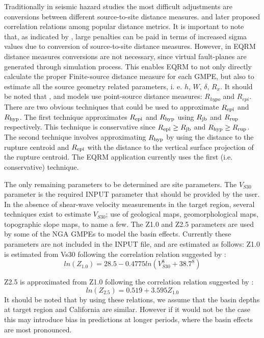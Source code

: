 Traditionally in seismic hazard studies the most difficult
adjustments are conversions between different source-to-site
distance measures. \citet{eqrm_Scherbaum04b} and later
\citet{eqrm_Kak11} proposed correlation relations among popular
distance metrics. It is important to note that, as indicated by
\citet{eqrm_Scherbaum05}, large penalties can be paid in terms of
increased sigma values due to conversion of source-to-site distance
measures. However, in EQRM distance measures conversions are not
necessary, since virtual fault-planes are generated through
simulation process. This enables EQRM to not only directly calculate
the proper Finite-source distance measure for each GMPE, but also to
estimate all the source geometry related parameters, i. e. $h$, $W$,
$\delta$, $R_x$. It should be noted that \citet{eqrm_Gaull90a}, and
\citet{eqrm_Liang08} models use point-source distance measures:
$R_{hypo}$ and $R_{epi}$. There are two obvious techniques that
could be used to approximate $\Repi$ and $\Rhyp$. The first
technique approximates $\Repi$ and $\Rhyp$ using $\Rjb$ and $\Rrup$
respectively. This technique is conservative since \mbox{$\Repi \geq
\Rjb$} and \mbox{$\Rhyp \geq \Rrup$}. The second technique involves
approximating $\Rhyp$ by using the distance to the rupture centroid
and $\Repi$ with the distance to the vertical surface projection of
the rupture centroid. The EQRM application currently uses the first
(i.e. conservative) technique.

The only remaining parameters to be determined are site parameters.
The $V_{S30}$ parameter is the required INPUT parameter that should
be provided by the user. In the absence of shear-wave velocity
measurements in the target region, several techniques exist to
estimate $V_{S30}$; use of geological maps, geomorphological maps,
topographic slope maps, to name a few. The Z1.0 and Z2.5 parameters
are used by some of the NGA GMPEs to model the basin effects.
Currently these parameters are not included in the INPUT file, and
are estimated as follows: Z1.0 is estimated from Vs30 following the
correlation relation suggested by \citet{eqrm_Chiou08}:
\begin{equation}
ln(Z_{1.0}) = 28.5-0.4775ln(V_{S30}^8+38.7^8)
\end{equation}

Z2.5 is approximated from Z1.0 following the correlation relation
suggested by \citet{eqrm_Campbell07}:
\begin{equation}
ln(Z_{2.5}) = 0.519+3.595Z_{1.0}
\end{equation}
It should be noted that by using these relations, we assume that the
basin depths at target region and California are similar. However if
it would not be the case this may introduce bias in predictions at
longer periods, where the basin effects are most pronounced.

